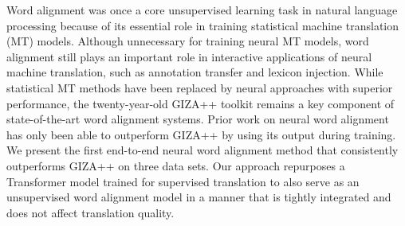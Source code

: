 Word alignment was once a core unsupervised learning task in natural language processing because of its essential role in training statistical machine translation (MT) models. Although unnecessary for training neural MT models, word alignment still plays an important role in interactive applications of neural machine translation, such as annotation transfer and lexicon injection. While statistical MT methods have been replaced by neural approaches with superior performance, the twenty-year-old GIZA++ toolkit remains a key component of state-of-the-art word alignment systems. Prior work on neural word alignment has only been able to outperform GIZA++ by using its output during training. We present the first end-to-end neural word alignment method that consistently outperforms GIZA++ on three data sets. Our approach repurposes a Transformer model trained for supervised translation to also serve as an unsupervised word alignment model in a manner that is tightly integrated and does not affect translation quality.
